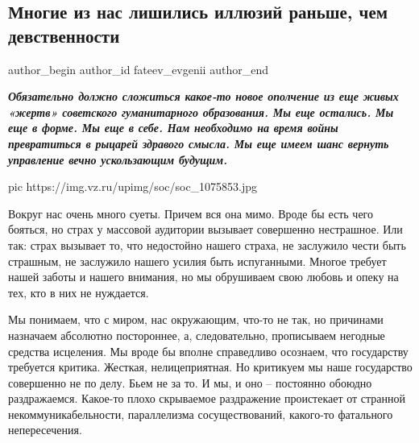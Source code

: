  
 
 
 
 
 
\subsection{Многие из нас лишились иллюзий раньше, чем девственности}
\label{sec:16_12_2020.news.ru.vz.fateev_evgenii.1.illuzii_devstvennost}
\ifcmt
	author_begin
   author_id fateev_evgenii
	author_end
\fi

\textbf{\em\large Обязательно должно сложиться какое-то новое ополчение из еще живых «жертв»
советского гуманитарного образования. Мы еще остались. Мы еще в форме. Мы еще в
себе. Нам необходимо на время войны превратиться в рыцарей здравого смысла. Мы
еще имеем шанс вернуть управление вечно ускользающим будущим.}


\ifcmt
pic https://img.vz.ru/upimg/soc/soc_1075853.jpg
\fi

Вокруг нас очень много суеты. Причем вся она мимо. Вроде бы есть чего бояться,
но страх у массовой аудитории вызывает совершенно нестрашное. Или так: страх
вызывает то, что недостойно нашего страха, не заслужило чести быть страшным, не
заслужило нашего усилия быть испуганными. Многое требует нашей заботы и нашего
внимания, но мы обрушиваем свою любовь и опеку на тех, кто в них не нуждается.

Мы понимаем, что с миром, нас окружающим, что-то не так, но причинами назначаем
абсолютно постороннее, а, следовательно, прописываем негодные средства
исцеления. Мы вроде бы вполне справедливо осознаем, что государству требуется
критика. Жесткая, нелицеприятная. Но критикуем мы наше государство совершенно
не по делу. Бьем не за то. И мы, и оно – постоянно обоюдно раздражаемся.
Какое-то плохо скрываемое раздражение проистекает от странной
некоммуникабельности, параллелизма сосуществований, какого-то фатального
непересечения. 

